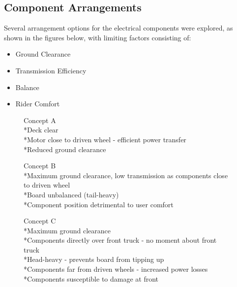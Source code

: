 \documentclass[journal,10pt]{IEEEtran}
\begin{document}
    \subsection{Component Arrangements}
        Several arrangement options for the electrical components were explored, as shown in the figures below, with limiting factors consisting of:
        \begin{itemize}
            	\item Ground Clearance
            	\item Transmission Efficiency
            	\item Balance 
            	\item Rider Comfort
            \end{itemize}
        \begin{figure}[H]
                \centering
                \caption{Concept A
                \\*Deck clear
                \\*Motor close to driven wheel - efficient power transfer
                \\*Reduced ground clearance}
                \label{fig:ConceptA}
            \end{figure} 
        \begin{figure}[H]
                \centering
                \caption{Concept B
                \\*Maximum ground clearance, low transmission as components close to driven wheel
                \\*Board unbalanced (tail-heavy)
                \\*Component position detrimental to user comfort}
                \label{fig:ConceptB}
            \end{figure}  
        \begin{figure}[H]
                \centering
                \caption{Concept C
                \\*Maximum ground clearance
                \\*Components directly over front truck - no moment about front truck
                \\*Head-heavy - prevents board from tipping up
                \\*Components far from driven wheels - increased power losses
                \\*Components susceptible to damage at front}
                \label{fig:ConceptC}
            \end{figure} 
\end{document}
